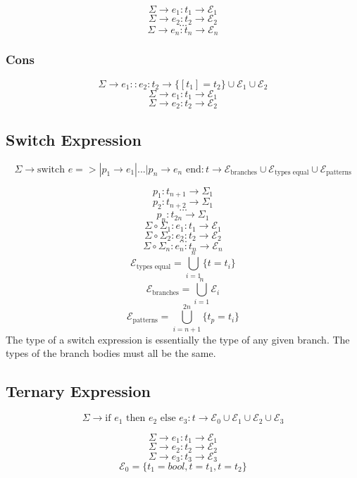 \documentclass[titlepage]{article}
\begin{document}
$$\Sigma \rightarrow e_1 : t_1 \rightarrow \mathcal{E}_1$$
$$\Sigma \rightarrow e_2 : t_2 \rightarrow \mathcal{E}_2$$
$$\dots$$
$$\Sigma \rightarrow e_n : t_n \rightarrow \mathcal{E}_n$$

\subsubsection{Cons}

$$\Sigma \rightarrow e_1 :: e_2 : t_2 \rightarrow \{[t_1] = t_2\} \cup \mathcal{E}_1 \cup \mathcal{E}_2$$
\noindent\makebox[\linewidth]{\rule{2.8in}{0.4pt}}
$$\Sigma \rightarrow e_1 : t_1 \rightarrow \mathcal{E}_1$$
$$\Sigma \rightarrow e_2 : t_2 \rightarrow \mathcal{E}_2$$

\subsection{Switch Expression}


$$\Sigma \rightarrow \text{switch } e => | p_1 \rightarrow e_1 | ... | p_n \rightarrow e_n \text{ end} : t \rightarrow \mathcal{E}_\text{branches} \cup \mathcal{E}_\text{types equal} \cup \mathcal{E}_\text{patterns}$$
\noindent\makebox[\linewidth]{\rule{4.9in}{0.4pt}}

$$p_1 : t_{n + 1} \rightarrow \Sigma_1$$
$$p_2 : t_{n + 2} \rightarrow \Sigma_1$$
$$\dots$$
$$p_n : t_{2n} \rightarrow \Sigma_1$$
$$\Sigma \circ \Sigma_1: e_1 : t_1 \rightarrow \mathcal{E}_1$$
$$\Sigma \circ \Sigma_2: e_2 : t_2 \rightarrow \mathcal{E}_2$$
$$\dots$$
$$\Sigma \circ \Sigma_n: e_n : t_n \rightarrow \mathcal{E}_n$$
$$\mathcal{E}_\text{types equal} = \bigcup _ {i = 1} ^ n \{t = t_i\}$$
$$\mathcal{E}_\text{branches} = \bigcup _ {i = 1} ^ n \mathcal{E}_i$$
$$\mathcal{E}_\text{patterns} = \bigcup _ {i = n + 1} ^ {2n} \{t_p = t_i\}$$
The type of a switch expression is essentially the type of any given branch. The types of the branch bodies must all be the same.


\subsection{Ternary Expression}

$$\Sigma \rightarrow \text{if } e_1 \text{ then } e_2 \text{ else } e_3 : t \rightarrow \mathcal{E}_0 \cup \mathcal{E}_1 \cup \mathcal{E}_2 \cup \mathcal{E}_3$$
\noindent\makebox[\linewidth]{\rule{3.4in}{0.4pt}}

$$\Sigma \rightarrow e_1 : t_1 \rightarrow \mathcal{E}_1$$
$$\Sigma \rightarrow e_2 : t_2 \rightarrow \mathcal{E}_2$$
$$\Sigma \rightarrow e_3 : t_3 \rightarrow \mathcal{E}_3$$
$$\mathcal{E}_0 = \{t_1 = bool, t = t_1, t = t_2\}$$
\end{document}
